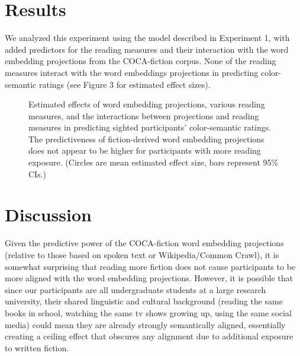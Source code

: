 \documentclass[10pt,letterpaper]{article}
\begin{document}
\section{Results}
We analyzed this experiment using the model described in Experiment 1, with added predictors for the reading measures and their interaction with the word embedding projections from the COCA-fiction corpus.
None of the reading measures interact with the word embeddings projections in predicting color-semantic ratings (see Figure 3 for estimated effect sizes).
\begin{figure}[h!]
\begin{center}
\caption{Estimated effects of word embedding projections, various reading measures, and the interactions between projections and reading measures in predicting sighted participants' color-semantic ratings. The predictiveness of fiction-derived word embedding projections does not appear to be higher for participants with more reading exposure. (Circles are mean estimated effect size, bars represent 95\% CIs.)}
\label{reading_measures}
\end{center}
\end{figure}

\section{Discussion}
Given the predictive power of the COCA-fiction word embedding projections (relative to those based on spoken text or Wikipedia/Common Crawl), it is somewhat surprising that reading more fiction does not cause participants to be more aligned with the word embedding projections. However, it is possible that since our participants are all undergraduate students at a large research university, their shared linguistic and cultural background (reading the same books in school, watching the same tv shows growing up, using the same social media) could mean they are already strongly semantically aligned, essentially creating a ceiling effect that obscures any alignment due to additional exposure to written fiction.
\end{document}
